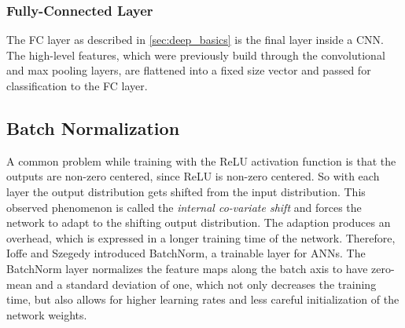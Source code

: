 \subsubsection{Fully-Connected Layer}

The \ac{FC} layer as described in \ref{sec:deep_basics} is the final layer inside a \ac{CNN}.
The high-level features, which were previously build through the convolutional and max pooling layers, are flattened into a fixed size vector and passed for classification to the \ac{FC} layer.

\subsection{Batch Normalization}

A common problem while training with the \ac{ReLU} activation function is that the outputs are non-zero centered, since \ac{ReLU} is non-zero centered.
So with each layer the output distribution gets shifted from the input distribution.
This observed phenomenon is called the \textit{internal co-variate shift} and forces the network to adapt to the shifting output distribution.
The adaption produces an overhead, which is expressed in a longer training time of the network.
Therefore, Ioffe and Szegedy \cite{batchnorm} introduced \ac{BatchNorm}, a trainable layer for \acp{ANN}.
The \ac{BatchNorm} layer normalizes the feature maps along the batch axis to have zero-mean and a standard deviation of one, which not only decreases the training time, but also allows for higher learning rates and less careful initialization of the network weights.
